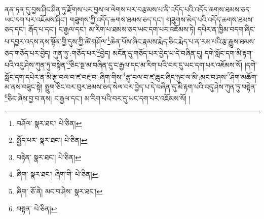 ནན་ཏན་དུ་བྱས་ཤིང་ཤིན་ཏུ་རྫོགས་པར་བྱས་ལ་ལེགས་པར་བརྩམས་པ་ནི་འདོད་པའི་འདོད་ཆགས་ཐམས་ཅད་ཡང་དག་པར་འཇོམས་ཤིང་། གཟུགས་ཀྱི་འདོད་ཆགས་ཐམས་ཅད་དང་། གཟུགས་མེད་པའི་འདོད་ཆགས་ཐམས་ཅད་དང་། རྒོད་པ་དང་། ང་རྒྱལ་དང་། མ་རིག་པ་ཐམས་ཅད་ཡང་དག་པར་འཇོམས་ཏེ། དཔེར་ན་ཁྱིམ་བདག་ཞིང་པ་དབྱར་འདས་ནས་སྟོན་གྱི་དུས་ཀྱི་ཚེ་གཤོལ་\footnote{བཤོལ་  སྣར་ཐང་།  པེ་ཅིན། }ཆེན་པོས་ཞིང་རྣམས་རྨེད་ཅིང་རྨེད་པ་ན་རམ་པའི་རྩ་རྒྱུས་ཐམས་ཅད་གཅོད་པར་བྱེད། ཀུན་ཏུ་:གཅོད་པར་\footnote{སྤྱོད་པར་  སྣར་ཐང་།  པེ་ཅིན། }བྱེད། མངོན་དུ་གཅོད་པར་བྱེད་པ་དེ་བཞིན་དུ། དགེ་སློང་དག་མི་རྟག་པའི་འདུ་ཤེས་ཀུན་ཏུ་བསྟེན་\footnote{བརྟེན་  སྣར་ཐང་།  པེ་ཅིན། }ཅིང་སྔ་མ་བཞིན་དུ་ང་རྒྱལ་དང་མ་རིག་པའི་བར་དུ་ཡང་དག་པར་འཇོམས་སོ། །དགེ་སློང་དག་དཔེར་ན་མི་རྩྭ་བལ་བ་ཛ་བརྔ་བ་:ཞིག་གིས་\footnote{ཞིག་  སྣར་ཐང་། ཞིག་གི་  པེ་ཅིན། }རྩྭ་བལ་བ་ཛ་ཆུང་ཞིང་ཉུང་ལ་མི་:མང་བ་ཤས་\footnote{ཞིག་  ཅོ་ནེ། མང་བ་ཤེས་  སྣར་ཐང་། }ཤིག་མཆོག་མ་ནས་བཟུང་སྟེ། སྤྲུག་ཅིང་བར་བུར་ཐམས་ཅད་སེལ་བར་བྱེད་པ་དེ་བཞིན་དུ་མི་རྟག་པའི་འདུ་ཤེས་ཀུན་ཏུ་བསྟེན་\footnote{བསྟན་  པེ་ཅིན། }ཅིང་ཞེས་བྱ་བ་ནས། ང་རྒྱལ་དང་། མ་རིག་པའི་བར་དུ་ཡང་དག་པར་འཇོམས་སོ། །
